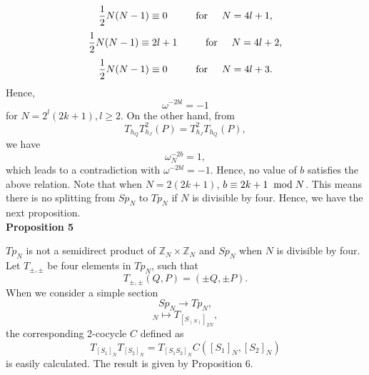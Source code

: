 \documentclass[12pt]{iopart}
\begin{document}
\begin{equation}
\frac12N(N-1)\equiv0
\hspace{10mm}
{\rm for}
\hspace{5mm}
N=4l+1,
\end{equation}
\begin{equation}
\frac12N(N-1)\equiv2l+1
\hspace{10mm}
{\rm for}
\hspace{5mm}
N=4l+2,
\end{equation}
\begin{equation}
\frac12N(N-1)\equiv0
\hspace{10mm}
{\rm for}
\hspace{5mm}
N=4l+3.
\end{equation}
Hence,
\begin{equation}
\omega^{-2bl}=-1
\end{equation}
for \(N=2^l(2k+1),l\ge2\).
%
On the other hand, from
\begin{equation}
T_{h_Q}T_{h_J}^2(P)=T_{h_J}^2T_{h_Q}(P),
\end{equation}
we have
\begin{equation}
\omega_N^{-2b}=1,
\end{equation}
which leads to a contradiction with \(\omega^{-2bl}=-1\).
Hence, no value of \(b\) satisfies the above relation.
Note that when \(N=2(2k+1)\), \(b\equiv2k+1
\hspace{1mm}\bmod N\).
%
This means there is no splitting
from \(Sp_N\) to \(Tp_N\) if \(N\) is divisible by four.
Hence, we have the next proposition.
\\

\noindent
{\bf Proposition 5}
\vspace{2mm}

\(Tp_N\) is not a semidirect product of \(\mathbb Z_N\times\mathbb Z_N\) and \(Sp_N\)
when \(N\) is divisible by four.
\\

Let \(T_{\pm,\pm}\) be four elements in \(Tp_N\), such that
\begin{equation}
T_{\pm,\pm}(Q,P)=(\pm Q,\pm P).
\end{equation}
When we consider a simple section
\begin{equation}
Sp_N\rightarrow Tp_N,
\end{equation}
\begin{equation}
[S]_N\mapsto T_{[S_{(N)}]_{2N}},
\end{equation}
the corresponding 2-cocycle \(C\) defined as
\begin{equation}
T_{[S_1]_N}T_{[S_2]_N}=T_{[S_1S_2]_N}C([S_1]_N,[S_2]_N)
\end{equation}
is easily calculated.
%
The result is given by Proposition 6.
\\
\end{document}
